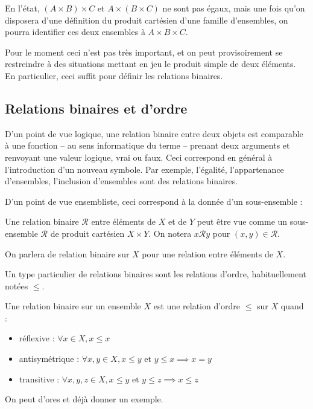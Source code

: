 En l'état, $(A\times B)\times C$ et $A\times (B\times C)$ ne sont pas égaux, mais une fois qu'on disposera d'une définition du produit cartésien d'une famille d'ensembles, on pourra identifier ces deux ensembles à $A\times B \times C$. 

Pour le moment ceci n'est pas très important, et on peut provisoirement se restreindre à des situations mettant en jeu le produit simple de deux éléments. En particulier, ceci suffit pour définir les relations binaires.

\subsection*{Relations binaires et d'ordre}
D'un point de vue logique, une relation binaire entre deux objets est comparable à une fonction -- au sens informatique du terme -- prenant deux arguments et renvoyant une valeur logique, vrai ou faux. Ceci correspond en général à l'introduction d'un nouveau symbole. Par exemple, l'égalité, l'appartenance d'ensembles, l'inclusion d'ensembles sont des relations binaires.

D'un point de vue ensembliste, ceci correspond à la donnée d'un sous-ensemble :
\begin{defini}
    Une relation binaire $\mathcal{R}$ entre éléments de $X$ et de $Y$ peut être vue comme un sous-ensemble $\mathcal{R}$  de produit cartésien $X\times Y$. On notera $x\mathcal{R} y$ pour $(x,y)\in \mathcal{R}$.
\end{defini}

On parlera de relation binaire sur $X$ pour une relation entre éléments de $X$. 

Un type particulier de relations binaires sont les relations d'ordre, habituellement notées $\leq$.

\begin{defini}
    Une relation binaire sur un ensemble $X$ est une relation d'ordre $\leq$ sur $X$ quand :
    \begin{itemize}
        \item réflexive : $\forall x\in X, x\leq x$
        \item antisymétrique : $\forall x,y \in X, x \leq y \text{ et } y \leq x \implies x=y$
        \item transitive : $\forall x,y,z \in X, x\leq y \text{ et } y \leq z \implies x\leq z$
    \end{itemize}  
\end{defini}

On peut d'ores et déjà donner un exemple.

